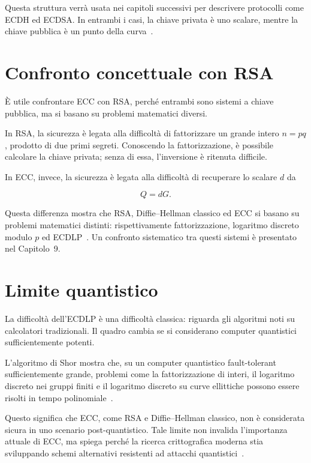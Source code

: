 \documentclass[12pt,a4paper,oneside]{report}
\begin{document}
Questa struttura verrà usata nei capitoli successivi per descrivere protocolli come ECDH ed ECDSA. In entrambi i casi, la chiave privata è uno scalare, mentre la chiave pubblica è un punto della curva~\cite{margara_ec,sec1}.

\section{Confronto concettuale con RSA}

È utile confrontare ECC con RSA, perché entrambi sono sistemi a chiave pubblica, ma si basano su problemi matematici diversi.

In RSA, la sicurezza è legata alla difficoltà di fattorizzare un grande intero \(n=pq\), prodotto di due primi segreti. Conoscendo la fattorizzazione, è possibile calcolare la chiave privata; senza di essa, l'inversione è ritenuta difficile.

In ECC, invece, la sicurezza è legata alla difficoltà di recuperare lo scalare \(d\) da

\[
Q=dG.
\]

Questa differenza mostra che RSA, Diffie--Hellman classico ed ECC si basano su problemi matematici distinti: rispettivamente fattorizzazione, logaritmo discreto modulo \(p\) ed ECDLP~\cite{margara_rsa,margara_dh,margara_ec,nist_sp800_57}. Un confronto sistematico tra questi sistemi è presentato nel Capitolo~9.

\section{Limite quantistico}

La difficoltà dell'ECDLP è una difficoltà classica: riguarda gli algoritmi noti su calcolatori tradizionali. Il quadro cambia se si considerano computer quantistici sufficientemente potenti.

L'algoritmo di Shor mostra che, su un computer quantistico fault-tolerant sufficientemente grande, problemi come la fattorizzazione di interi, il logaritmo discreto nei gruppi finiti e il logaritmo discreto su curve ellittiche possono essere risolti in tempo polinomiale~\cite{margara_pqc}.

Questo significa che ECC, come RSA e Diffie--Hellman classico, non è considerata sicura in uno scenario post-quantistico. Tale limite non invalida l'importanza attuale di ECC, ma spiega perché la ricerca crittografica moderna stia sviluppando schemi alternativi resistenti ad attacchi quantistici~\cite{margara_pqc}.
\end{document}

